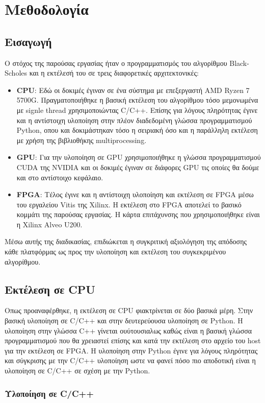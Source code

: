\chapter{Μεθοδολογία}
\section{Εισαγωγή}
Ο στόχος της παρούσας εργασίας ήταν ο προγραμματισμός του αλγορίθμου Black-Scholes και η εκτέλεσή του σε τρεις διαφορετικές αρχιτεκτονικές:

\begin{itemize}
    \item \textbf{CPU}: Εδώ οι δοκιμές έγιναν σε ένα σύστημα με επεξεργαστή AMD Ryzen 7 5700G.
    Πραγματοποιήθηκε η βασική εκτέλεση του αλγορίθμου τόσο μεμονωμένα με signle thread χρησιμοποιώντας C/C++.
    Επίσης για λόγους πληρότητας έγινε και η αντίστοιχη υλοποίηση στην πλέον διαδεδομένη γλώσσα προγραμματισμού Python,
    οπου και δοκιμάστηκαν τόσο η σειριακή όσο και η παράλληλη εκτέλεση με χρήση της βιβλιοθήκης multiprocessing.
    \item \textbf{GPU}: Για την υλοποίηση σε GPU χρησιμοποιήθηκε η γλώσσα προγραμματισμού CUDA της NVIDIA και οι δοκιμές έγιναν σε διάφορες GPU τις οποίες θα δούμε και στο
    αντίστοιχο κεφάλαιο.
    \item \textbf{FPGA}: Τέλος έγινε και η αντίστοιχη υλοποίηση και εκτέλεση σε FPGA μέσω του εργαλείου Vitis της Xilinx.
    Η εκτέλεση στο FPGA αποτελεί το βασικό κομμάτι της παρούσας εργασίας. Η κάρτα επιτάχυνσης που χρησιμοποιήθηκε είναι η Xilinx Alveo U200.
\end{itemize}
Μέσω αυτής της διαδικασίας, επιδιώκεται η συγκριτική αξιολόγηση της απόδοσης κάθε πλατφόρμας ως προς την υλοποίηση και εκτέλεση του συγκεκριμένου αλγορίθμου.

\section{Εκτέλεση σε CPU}
Οπως προαναφέρθηκε, η εκτέλεση σε CPU φιακτρίνεται σε δύο βασικά μέρη. Στην βασική υλοποίηση σε C/C++ και στην δευτερεύουσα υλοποίηση σε Python.
Η υλοποίηση στην γλώσσα C++ γίνεται ουύτουσιαλως καθώς είναι η βασική γλώσσα προγραμματισμού που θα χρειαστεί επίσης και κατά την εκτέλεση στο αρχείο του host
για την εκτέλεση σε FPGA. Η υλοποίηση στην Python έγινε για λόγους πληρότητας και σύγκρισης με την C/C++ υλοποίηση ωστε να φανεί πόσο πιο αποδοτική
είναι η υλοποίηση σε C/C++ σε σχέση με την Python.

\subsection{Υλοποίηση σε C/C++}

